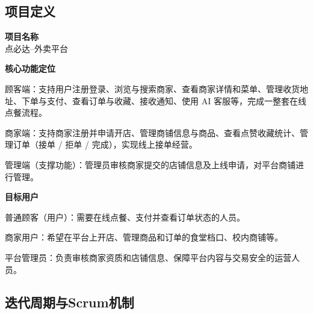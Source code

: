 \subsection{项目定义}
\begin{levellist}
    \item \textbf{项目名称} \\
    点必达--外卖平台

    \item \textbf{核心功能定位}
    \begin{levellist}
        \item 顾客端：支持用户注册登录、浏览与搜索商家、查看商家详情和菜单、管理收货地址、下单与支付、查看订单与收藏、接收通知、使用 AI 客服等，完成一整套在线点餐流程。
        \item 商家端：支持商家注册并申请开店、管理商铺信息与商品、查看点赞收藏统计、管理订单（接单 / 拒单 / 完成），实现线上接单经营。
        \item 管理端（支撑功能）：管理员审核商家提交的店铺信息及上线申请，对平台商铺进行管理。
    \end{levellist}

    \item \textbf{目标用户}
    \begin{levellist}
        \item 普通顾客（用户）：需要在线点餐、支付并查看订单状态的人员。
        \item 商家用户：希望在平台上开店、管理商品和订单的食堂档口、校内商铺等。
        \item 平台管理员：负责审核商家资质和店铺信息、保障平台内容与交易安全的运营人员。
    \end{levellist}

\end{levellist}

\newpage


\subsection{迭代周期与Scrum机制}

